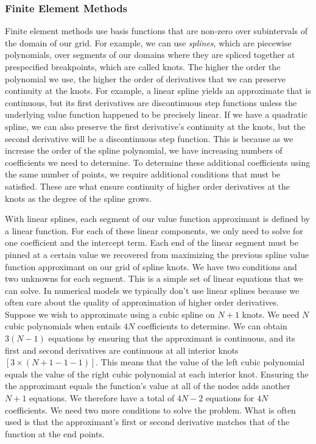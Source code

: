 \documentclass[11pt]{article}%
\begin{document}
\subsubsection{Finite Element Methods}
Finite element methods use basis functions that are non-zero over subintervals of the domain of our grid. For example, we can use \emph{splines}, which are piecewise polynomials, over segments of our domains where they are spliced together at prespecified breakpoints, which are called knots. The higher the order the polynomial we use, the higher the order of derivatives that we can preserve continuity at the knots. For example, a linear spline yields an approximate that is continuous, but its first derivatives are discontinuous step functions unless the underlying value function happened to be precisely linear. If we have a quadratic spline, we can also preserve the first derivative's continuity at the knots, but the second derivative will be a discontinuous step function. This is because as we increase the order of the spline polynomial, we have increasing numbers of coefficients we need to determine. To determine these additional coefficients using the same number of points, we require additional conditions that must be satisfied. These are what ensure continuity of higher order derivatives at the knots as the degree of the spline grows.

With linear splines, each segment of our value function approximant is defined by a linear function. For each of these linear components, we only need to solve for one coefficient and the intercept term. Each end of the linear segment must be pinned at a certain value we recovered from maximizing the previous spline value function approximant on our grid of spline knots. We have two conditions and two unknowns for each segment. This is a simple set of linear equations that we can solve. In numerical models we typically don't use linear splines because we often care about the quality of approximation of higher order derivatives. Suppose we wish to approximate using a cubic spline on $N+1$ knots. We need $N$ cubic polynomials when entails $4N$ coefficients to determine. We can obtain $3(N-1)$ equations by ensuring that the approximant is continuous, and its first and second derivatives are continuous at all interior knots $[3\times(N+1-1-1)]$. This means that the value of the left cubic polynomial equals the value of the right cubic polynomial at each interior knot. Ensuring the the approximant equals the function's value at all of the nodes adds another $N+1$ equations. We therefore have a total of $4N-2$ equations for $4N$ coefficients. We need two more conditions to solve the problem. What is often used is that the approximant's first or second derivative matches that of the function at the end points.
\end{document}
